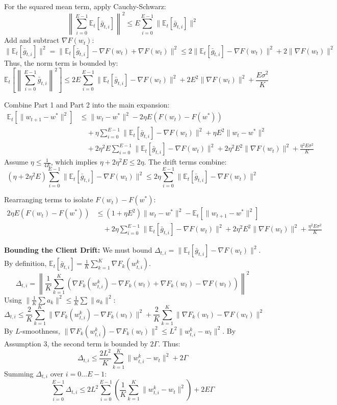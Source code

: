 \documentclass{article}
\begin{document}
For the squared mean term, apply Cauchy-Schwarz:
$$ \left\| \sum_{i=0}^{E-1} \mathbb{E}_t[\bar{g}_{t,i}] \right\|^2 \leq E \sum_{i=0}^{E-1} \|\mathbb{E}_t[\bar{g}_{t,i}]\|^2 $$
Add and subtract $\nabla F(w_t)$:
$$ \|\mathbb{E}_t[\bar{g}_{t,i}]\|^2 = \|\mathbb{E}_t[\bar{g}_{t,i}] - \nabla F(w_t) + \nabla F(w_t)\|^2 \leq 2\|\mathbb{E}_t[\bar{g}_{t,i}] - \nabla F(w_t)\|^2 + 2\|\nabla F(w_t)\|^2 $$
Thus, the norm term is bounded by:
$$ \mathbb{E}_t\left[ \left\| \sum_{i=0}^{E-1} \bar{g}_{t,i} \right\|^2 \right] \leq 2E \sum_{i=0}^{E-1} \|\mathbb{E}_t[\bar{g}_{t,i}] - \nabla F(w_t)\|^2 + 2E^2 \|\nabla F(w_t)\|^2 + \frac{E\sigma^2}{K} $$

Combine Part 1 and Part 2 into the main expansion:
\begin{align*}
\mathbb{E}_t[\|w_{t+1} - w^*\|^2] &\leq \|w_t - w^*\|^2 - 2\eta E (F(w_t) - F(w^*)) \\
&\quad + \eta \sum_{i=0}^{E-1} \|\mathbb{E}_t[\bar{g}_{t,i}] - \nabla F(w_t)\|^2 + \eta E^2 \|w_t - w^*\|^2 \\
&\quad + 2\eta^2 E \sum_{i=0}^{E-1} \|\mathbb{E}_t[\bar{g}_{t,i}] - \nabla F(w_t)\|^2 + 2\eta^2 E^2 \|\nabla F(w_t)\|^2 + \frac{\eta^2 E \sigma^2}{K}
\end{align*}
Assume $\eta \leq \frac{1}{4E}$, which implies $\eta + 2\eta^2 E \leq 2\eta$. The drift terms combine:
$$ (\eta + 2\eta^2 E) \sum_{i=0}^{E-1} \|\mathbb{E}_t[\bar{g}_{t,i}] - \nabla F(w_t)\|^2 \leq 2\eta \sum_{i=0}^{E-1} \|\mathbb{E}_t[\bar{g}_{t,i}] - \nabla F(w_t)\|^2 $$

Rearranging terms to isolate $F(w_t) - F(w^*)$:
\begin{align*}
2\eta E (F(w_t) - F(w^*)) &\leq (1 + \eta E^2)\|w_t - w^*\|^2 - \mathbb{E}_t[\|w_{t+1} - w^*\|^2] \\
&\quad + 2\eta \sum_{i=0}^{E-1} \|\mathbb{E}_t[\bar{g}_{t,i}] - \nabla F(w_t)\|^2 + 2\eta^2 E^2 \|\nabla F(w_t)\|^2 + \frac{\eta^2 E \sigma^2}{K}
\end{align*}

\textbf{Bounding the Client Drift:} We must bound $\Delta_{t,i} = \|\mathbb{E}_t[\bar{g}_{t,i}] - \nabla F(w_t)\|^2$.
By definition, $\mathbb{E}_t[\bar{g}_{t,i}] = \frac{1}{K}\sum_{k=1}^K \nabla F_k(w_{t,i}^k)$.
$$ \Delta_{t,i} = \left\| \frac{1}{K}\sum_{k=1}^K \left( \nabla F_k(w_{t,i}^k) - \nabla F_k(w_t) + \nabla F_k(w_t) - \nabla F(w_t) \right) \right\|^2 $$
Using $\|\frac{1}{K}\sum a_k\|^2 \leq \frac{1}{K}\sum \|a_k\|^2$:
$$ \Delta_{t,i} \leq \frac{2}{K}\sum_{k=1}^K \|\nabla F_k(w_{t,i}^k) - \nabla F_k(w_t)\|^2 + \frac{2}{K}\sum_{k=1}^K \|\nabla F_k(w_t) - \nabla F(w_t)\|^2 $$
By $L$-smoothness, $\|\nabla F_k(w_{t,i}^k) - \nabla F_k(w_t)\|^2 \leq L^2 \|w_{t,i}^k - w_t\|^2$. By Assumption 3, the second term is bounded by $2\Gamma$. Thus:
$$ \Delta_{t,i} \leq \frac{2L^2}{K}\sum_{k=1}^K \|w_{t,i}^k - w_t\|^2 + 2\Gamma $$
Summing $\Delta_{t,i}$ over $i=0 \dots E-1$:
$$ \sum_{i=0}^{E-1} \Delta_{t,i} \leq 2L^2 \sum_{i=0}^{E-1} \left( \frac{1}{K}\sum_{k=1}^K \|w_{t,i}^k - w_t\|^2 \right) + 2E\Gamma $$
\end{document}
